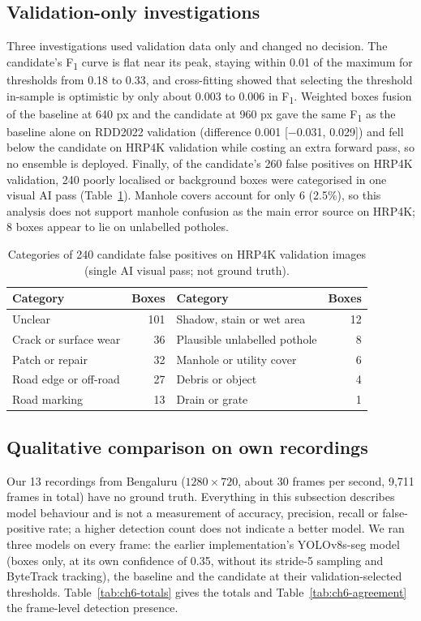 \subsection{Validation-only investigations}
Three investigations used validation data only and changed no decision. The candidate's F\textsubscript{1} curve is flat near its peak, staying within 0.01 of the maximum for thresholds from 0.18 to 0.33, and cross-fitting showed that selecting the threshold in-sample is optimistic by only about 0.003 to 0.006 in F\textsubscript{1}. Weighted boxes fusion \cite{solovyev2021wbf} of the baseline at 640 px and the candidate at 960 px gave the same F\textsubscript{1} as the baseline alone on RDD2022 validation (difference 0.001 [$-$0.031, 0.029]) and fell below the candidate on HRP4K validation while costing an extra forward pass, so no ensemble is deployed. Finally, of the candidate's 260 false positives on HRP4K validation, 240 poorly localised or background boxes were categorised in one visual AI pass (Table~\ref{tab:ch6-fp-categories}). Manhole covers account for only 6 (2.5\%), so this analysis does not support manhole confusion as the main error source on HRP4K; 8 boxes appear to lie on unlabelled potholes.

\begin{table}[!htbp]
\centering
\small
\renewcommand{\arraystretch}{1.15}
\begin{tabular}{|l|r|l|r|}
\hline
\textbf{Category} & \textbf{Boxes} & \textbf{Category} & \textbf{Boxes} \\
\hline
Unclear & 101 & Shadow, stain or wet area & 12 \\
\hline
Crack or surface wear & 36 & Plausible unlabelled pothole & 8 \\
\hline
Patch or repair & 32 & Manhole or utility cover & 6 \\
\hline
Road edge or off-road & 27 & Debris or object & 4 \\
\hline
Road marking & 13 & Drain or grate & 1 \\
\hline
\end{tabular}
\caption{Categories of 240 candidate false positives on HRP4K validation images (single AI visual pass; not ground truth).}
\label{tab:ch6-fp-categories}
\end{table}

\subsection{Qualitative comparison on own recordings}
Our 13 recordings from Bengaluru ($1280\times720$, about 30 frames per second, 9,711 frames in total) have no ground truth. Everything in this subsection describes model behaviour and is not a measurement of accuracy, precision, recall or false-positive rate; a higher detection count does not indicate a better model. We ran three models on every frame: the earlier implementation's YOLOv8s-seg model (boxes only, at its own confidence of 0.35, without its stride-5 sampling and ByteTrack tracking), the baseline and the candidate at their validation-selected thresholds. Table~\ref{tab:ch6-totals} gives the totals and Table~\ref{tab:ch6-agreement} the frame-level detection presence.


